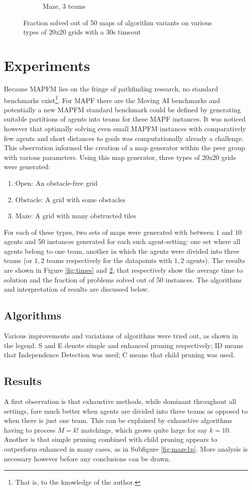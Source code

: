 \documentclass[english]{article}
\begin{document}
\begin{figure}
\begin{subfigure}{0.49\textwidth}
		\caption{Maze, 3 teams}
		\label{fig:maze3p}
	\end{subfigure}
	\caption{Fraction solved out of 50 maps of algorithm variants on various types of 20x20 grids with a 30s timeout}
	\label{fig:probs}
\end{figure}
	
	\section{Experiments}
	Because MAPFM lies on the fringe of pathfinding research, no standard benchmarks exist\footnote{That is, to the knowledge of the author.}. For MAPF there are the Moving AI benchmarks \cite{sturtevant2012} and potentially a new MAPFM standard benchmark could be defined by generating suitable partitions of agents into teams for these MAPF instances. It was noticed however that optimally solving even small MAPFM instances with comparatively few agents and short distances to goals was computationally already a challenge. This observation informed the creation of a map generator within the peer group with various parameters. Using this map generator, three types of 20x20 grids were generated:
	\begin{enumerate}
		\item Open: An obstacle-free grid
		\item Obstacle: A grid with some obstacles
		\item Maze: A grid with many obstructed tiles
	\end{enumerate}
	For each of these types, two sets of maps were generated with between $1$ and $10$ agents and 50 instances generated for each such agent-setting: one set where all agents belong to one team, another in which the agents were divided into three teams (or $1,2$ teams respectively for the datapoints with $1,2$ agents). The results are shown in Figure \ref{fig:times} and \ref{fig:probs}, that respectively show the average time to solution and the fraction of problems solved out of 50 instances. The algorithms and interpretation of results are discussed below.
	\subsection{Algorithms}
	Various improvements and variations of algorithms were tried out, as shown in the legend. S and E denote simple and enhanced pruning respectively; ID means that Independence Detection was used; C means that child pruning was used.
	\subsection{Results}
	A first observation is that exhaustive methods, while dominant throughout all settings, fare much better when agents are divided into three teams as opposed to when there is just one team. This can be explained by exhaustive algorithms having to process $M = k!$ matchings, which grows quite large for say $k = 10$. Another is that simple pruning combined with child pruning appears to outperform enhanced in many cases, as in Subfigure \ref{fig:maze1p}. More analysis is necessary however before any conclusions can be drawn.
	
\end{document}
